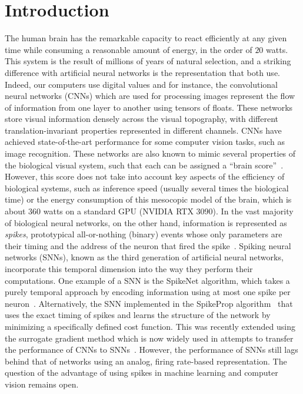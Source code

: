 \documentclass[default]{sn-jnl}%
\theoremstyle{thmstyleone}%
\theoremstyle{thmstyletwo}%
\theoremstyle{thmstylethree}%
\begin{document}
\section{Introduction}
\label{sec:intro}
%
The human brain has the remarkable capacity to react efficiently at any given time while consuming a reasonable amount of energy, in the order of $20$ watts. This system is the result of millions of years of natural selection, and a striking difference with artificial neural networks is the representation that both use. Indeed, our computers use digital values and for instance, the convolutional neural networks (CNNs) which are used for processing images represent the flow of information from one layer to another using tensors of floats. These networks store visual information densely across the visual topography, with different translation-invariant properties represented in different channels. CNNs have achieved state-of-the-art performance for some computer vision tasks, such as image recognition. These networks are also known to mimic several properties of the biological visual system, such that each can be assigned a ``brain score''~\citep{schrimpf_brain-score_2020}. However, this score does not take into account key aspects of the efficiency of biological systems, such as inference speed (usually several times the biological time) or the energy consumption of this mesocopic model of the brain, which is about $360$ watts on a standard GPU (NVIDIA RTX 3090). In the vast majority of biological neural networks, on the other hand, information is represented as \emph{spikes}, prototypical all-or-nothing (binary) events whose only parameters are their timing and the address of the neuron that fired the spike~\citep{paugam-moisy_computing_2012}. Spiking neural networks (SNNs), known as the third generation of artificial neural networks, incorporate this temporal dimension into the way they perform their computations. One example of a SNN is the SpikeNet algorithm, which takes a purely temporal approach by encoding information using at most one spike per neuron~\citep{delorme_spikenet_1999}. Alternatively, the SNN implemented in the SpikeProp algorithm~\citep{bohte_error-backpropagation_2002} that uses the exact timing of spikes and learns the structure of the network by minimizing a specifically defined cost function. This was recently extended using the surrogate gradient method which is now widely used in attempts to transfer the performance of CNNs to SNNs~\citep{zenke_remarkable_2021}. However, the performance of SNNs still lags behind that of networks using an analog, firing rate-based representation. The question of the advantage of using spikes in machine learning and computer vision remains open.
\end{document}
